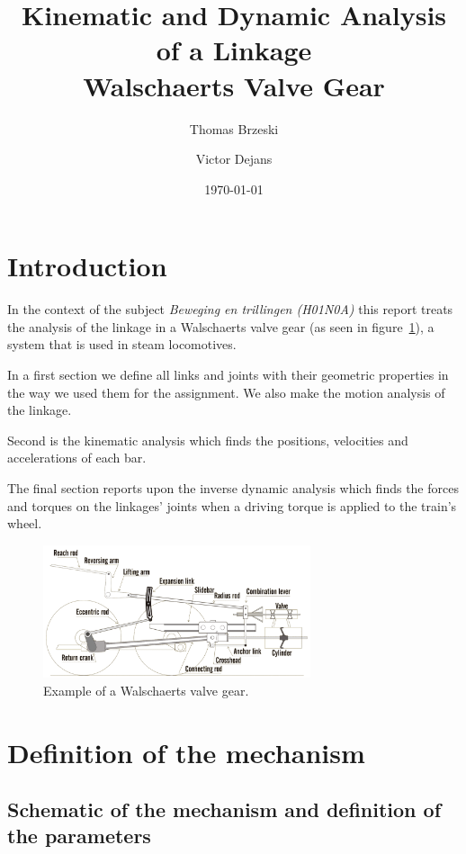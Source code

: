 \documentclass[a4paper]{article}
\date{\today}
\author{Thomas Brzeski \and  Victor Dejans}
\title{Kinematic and Dynamic Analysis of a Linkage\\ Walschaerts Valve Gear}
\begin{document}
\maketitle

\section*{Introduction}

In the context of the subject \textit{Beweging en trillingen (H01N0A)} this report treats the analysis of the linkage in a Walschaerts valve gear (as seen in figure~\ref{fig:basistekening}), a system that is used in steam locomotives.

In a first section we define all links and joints with their geometric properties in the way we used them for the assignment. We also make the motion analysis of the linkage.

Second is the kinematic analysis which finds the positions, velocities and accelerations of each bar.

The final section reports upon the inverse dynamic analysis which finds the forces and torques on the linkages' joints when a driving torque is applied to the train's wheel.

\begin{figure}[h]
	\includegraphics[width=0.7\textwidth]{wvgverslag.png}
	\centering
	\caption{Example of a Walschaerts valve gear. \cite{ove06}}
	\label{fig:basistekening}
\end{figure}

\newpage
\tableofcontents

\section{Definition of the mechanism}

\subsection{Schematic of the mechanism and definition of the parameters}
\end{document}
